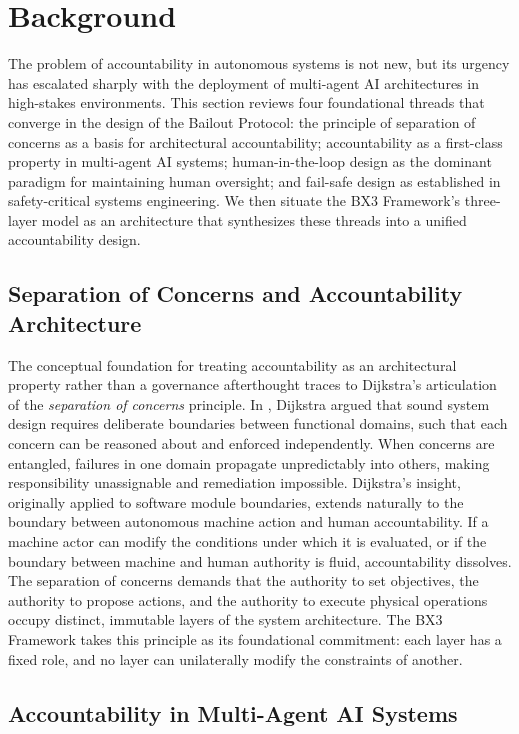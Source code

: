 \section{Background}
\label{sec:background}

The problem of accountability in autonomous systems is not new, but its urgency has escalated sharply with the deployment of multi-agent AI architectures in high-stakes environments. This section reviews four foundational threads that converge in the design of the Bailout Protocol: the principle of separation of concerns as a basis for architectural accountability; accountability as a first-class property in multi-agent AI systems; human-in-the-loop design as the dominant paradigm for maintaining human oversight; and fail-safe design as established in safety-critical systems engineering. We then situate the BX3 Framework's three-layer model as an architecture that synthesizes these threads into a unified accountability design.

\subsection{Separation of Concerns and Accountability Architecture}

The conceptual foundation for treating accountability as an architectural property rather than a governance afterthought traces to Dijkstra's articulation of the \textit{separation of concerns} principle. In \cite{dijkstra1982}, Dijkstra argued that sound system design requires deliberate boundaries between functional domains, such that each concern can be reasoned about and enforced independently. When concerns are entangled, failures in one domain propagate unpredictably into others, making responsibility unassignable and remediation impossible. Dijkstra's insight, originally applied to software module boundaries, extends naturally to the boundary between autonomous machine action and human accountability. If a machine actor can modify the conditions under which it is evaluated, or if the boundary between machine and human authority is fluid, accountability dissolves. The separation of concerns demands that the authority to set objectives, the authority to propose actions, and the authority to execute physical operations occupy distinct, immutable layers of the system architecture. The BX3 Framework takes this principle as its foundational commitment: each layer has a fixed role, and no layer can unilaterally modify the constraints of another.

\subsection{Accountability in Multi-Agent AI Systems}

